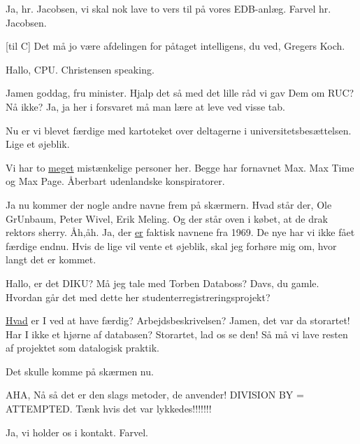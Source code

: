 \documentclass[a4paper,11pt]{article}
\begin{document}
\begin{sketch}
 Ja, hr. Jacobsen, vi skal nok lave to vers til på vores
EDB-anlæg. Farvel hr. Jacobsen.

[til C] Det må jo være afdelingen for påtaget intelligens, du ved,
Gregers Koch.



 Hallo, CPU. Christensen speaking.

 Jamen goddag, fru minister. Hjalp det så med det lille råd vi gav Dem
om RUC? Nå ikke? Ja, ja her i forsvaret må man lære at leve ved visse tab.

 Nu er vi blevet færdige med kartoteket over deltagerne i
universitetsbesættelsen. Lige et øjeblik. 

 Vi har to \underline{meget} mistænkelige personer her. Begge har
fornavnet Max. Max Time og Max Page. Åberbart udenlandske konspiratorer.

 Ja nu kommer der nogle andre navne frem på skærmern. Hvad står der, Ole
GrUnbaum, Peter Wivel, Erik Meling. Og der står oven i købet, at de drak rektors
sherry. Åh,åh. Ja, der \underline{er} faktisk navnene fra 1969. De nye har vi
ikke fået færdige endnu. Hvis de lige vil vente et øjeblik, skal jeg forhøre mig
om, hvor langt det er kommet. 

 Hallo, er det DIKU? Må jeg tale med Torben Databoss? Davs, du
gamle. Hvordan går det med dette her studenterregistreringsprojekt?

 \underline{Hvad} er I ved at have færdig? Arbejdsbeskrivelsen? Jamen,
det var da storartet! Har I ikke et hjørne af databasen? Storartet, lad os se
den! Så må vi lave resten af projektet som datalogisk praktik. 

 Det skulle komme på skærmen nu.

 AHA, Nå så det er den slags metoder, de anvender! DIVISION BY =
ATTEMPTED. Tænk hvis det var lykkedes!!!!!!!

 Ja, vi holder os i kontakt. Farvel.

\end{sketch}
\end{document}
